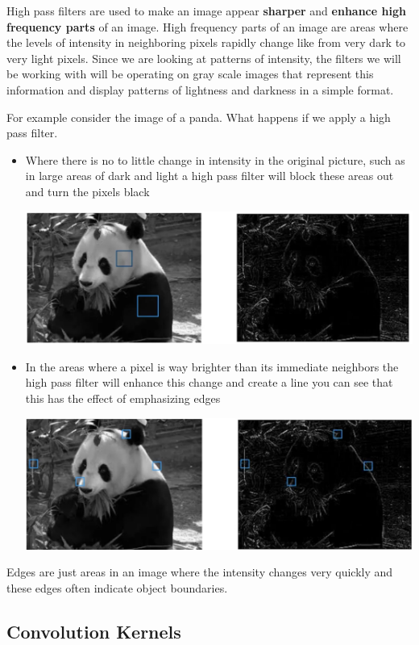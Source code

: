 High pass filters are used to make an image appear \textbf{sharper} and \textbf{enhance high frequency parts} of an image. High frequency parts of an image are areas where the levels of intensity in neighboring pixels rapidly change like from very dark to very light pixels. Since we are looking at patterns of intensity, the filters we will be working with will be operating on gray scale images that represent this information and display patterns of lightness and darkness in a simple format. \newline

For example consider the image of a panda. What happens if we apply a high pass filter. 
\begin{itemize}
    \item Where there is no to little change in intensity in the original picture, such as in large areas of dark and light a high pass filter will block these areas out and turn the pixels black

    \includegraphics[width=0.75\linewidth]{img//cnn//concepts/imagepanda2.png}

    \item In the areas where a pixel is way brighter than its immediate neighbors the high pass filter will enhance this change and create a line you can see that this has the effect of emphasizing edges

    \includegraphics[width=0.75\linewidth]{img//cnn//concepts/imagepanda3.png}

\end{itemize}

Edges are just areas in an image where the intensity changes very quickly and these edges often indicate object boundaries.

\subsection{Convolution Kernels}

